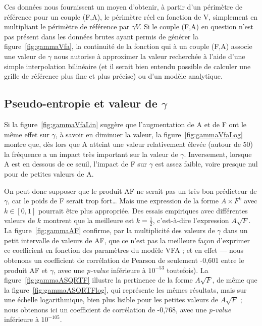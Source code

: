 	Ces données nous fournissent un moyen d'obtenir, à partir d'un périmètre de référence pour un couple (F,A), le périmètre réel en fonction de V, simplement en multipliant le périmètre de référence par $\gamma{}V$. Si le couple (F,A) en question n'est pas présent dans les données brutes ayant permis de générer la figure~\ref{fig:gammaVfa}, la continuité de la fonction qui à un couple (F,A) associe une valeur de $\gamma$ nous autorise à approximer la valeur recherchée à l'aide d'une simple interpolation bilinéaire (et il serait bien entendu possible de calculer une grille de référence plus fine et plus précise) ou d'un modèle analytique.
	
	\subsection{Pseudo-entropie et valeur de \texorpdfstring{$\gamma$}{gamma}}
	Si la figure~\ref{fig:gammaVfaLin} suggère que l'augmentation de A et de F ont le même effet sur $\gamma$, à savoir en diminuer la valeur, la figure~\ref{fig:gammaVfaLog} montre que, dès lors que A atteint une valeur relativement élevée (autour de 50) la fréquence a un impact très important sur la valeur de $\gamma$. Inversement, lorsque A est en dessous de ce seuil, l'impact de F sur $\gamma$ est assez faible, voire presque nul pour de petites valeurs de A.
	
	On peut donc supposer que le produit AF ne serait pas un très bon prédicteur de $\gamma$, car le poids de F serait trop fort\ldots{} Mais une expression de la forme $A\times{}F^{k}$ avec $k \in [0,1]$ pourrait être plus appropriée. Des essais empiriques avec différentes valeurs de $k$ montrent que la meilleure est $k = \frac{1}{2}$, c'est-à-dire l'expression $A\sqrt{F}$. La figure~\ref{fig:gammaAF} confirme, par la multiplicité des valeurs de $\gamma$ dans un petit intervalle de valeurs de AF, que ce n'est pas la meilleure façon d'exprimer ce coefficient en fonction des paramètres du modèle VFA ; et en effet --- nous obtenons un coefficient de corrélation de Pearson de seulement -0,601 entre le produit AF et $\gamma$, avec une \emph{p-value} inférieure à $10^{-53}$ toutefois). La figure~\ref{fig:gammaASQRTF} illustre la pertinence de la forme $A\sqrt{F}$, de même que la figure~\ref{fig:gammaASQRTFlog}, qui représente les mêmes résultats, mais sur une échelle logarithmique, bien plus lisible pour les petites valeurs de $A\sqrt{F}$ ; nous obtenons ici un coefficient de corrélation de -0,768, avec une \emph{p-value} inférieure à $10^{-105}$.
	
